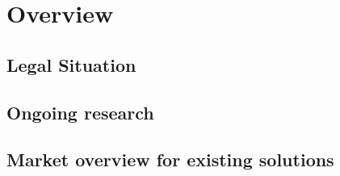 \documentclass[ExampleMasters.tex]{subfiles}
\begin{document}
\chapter{Overview}


\section{Legal Situation}

\section{Ongoing research}

\section{Market overview for existing solutions}
\end{document}

